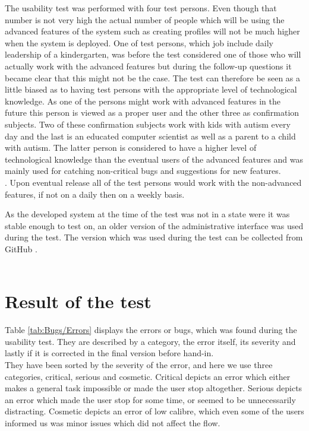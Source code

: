 The usability test was performed with four test persons. Even though that number is not very high the actual number of people which will be using the advanced features of the system such as creating profiles will not be much higher when the system is deployed. One of test persons, which job include daily leadership of a kindergarten, was before the test considered one of those who will actually work with the advanced features but during the follow-up questions it became clear that this might not be the case. The test can therefore be seen as a little biased as to having test persons with the appropriate level of technological knowledge. As one of the persons might work with advanced features in the future this person is viewed as a proper user and the other three as confirmation subjects. Two of these confirmation subjects work with kids with autism every day and the last is an educated computer scientist as well as a parent to a child with autism. The latter person is considered to have a higher level of technological knowledge than the eventual users of the advanced features and was mainly used for catching non-critical bugs and suggestions for new features.\\. Upon eventual release all of the test persons would work with the non-advanced features, if not on a daily then on a weekly basis.

As the developed system at the time of the test was not in a state were it was stable enough to test on, an older version of the administrative interface was used during the test. The version which was used during the test can be collected from GitHub \citep{testBranch}.\\
\\

\section{Result of the test}
Table \ref{tab:Bugs/Errors} displays the errors or bugs, which was found during the usability test. They are described by a category, the error itself, its severity and lastly if it is corrected in the final version before hand-in.\\
They have been sorted by the severity of the error, and here we use three categories, critical, serious and cosmetic. Critical depicts an error which either makes a general task impossible or made the user stop altogether. Serious depicts an error which made the user stop for some time, or seemed to be unnecessarily distracting. Cosmetic depicts an error of low calibre, which even some of the users informed us was minor issues which did not affect the flow.\\
\\

